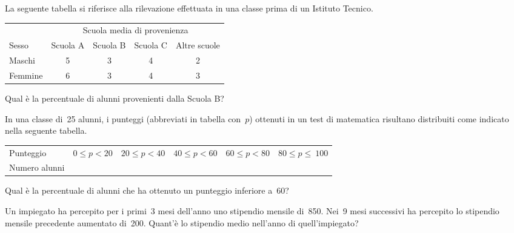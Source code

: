 \begin{esercizio}
\label{ese:A.52}
La seguente tabella si riferisce alla rilevazione effettuata in una classe prima di un Istituto Tecnico.
\begin{center}
 \begin{tabular}{l*{4}{c}}
\toprule
 & \multicolumn{4}{c}{Scuola media di provenienza}\\
Sesso & Scuola A & Scuola B & Scuola C & Altre scuole\\
\midrule
Maschi & 5 & 3 & 4 & 2 \\
Femmine & 6 & 3 & 4 & 3 \\
\bottomrule
\end{tabular}
\end{center}
Qual è la percentuale di alunni provenienti dalla Scuola B?
\end{esercizio}

\begin{esercizio}
\label{ese:A.53}
In una classe di~25 alunni, i punteggi (abbreviati in tabella con~$p$) ottenuti in un test di matematica risultano distribuiti come indicato nella seguente tabella.
\begin{center}
 \begin{tabular}{l*{5}{c}}
\toprule
Punteggio & $0 \leq p < 20$ & $20 \leq p < 40$ & $40 \leq p < 60$ & $60 \leq p < 80$ & $80 \leq p \leq~100$ \\
Numero alunni & & & & & \\
\bottomrule
\end{tabular}
\end{center}
Qual è la percentuale di alunni che ha ottenuto un punteggio inferiore a~60?
\end{esercizio}

\begin{esercizio}
\label{ese:A.54}
Un impiegato ha percepito per i primi~3 mesi dell'anno uno stipendio mensile di~850\officialeuro . Nei~9 mesi successivi ha percepito
lo stipendio mensile precedente aumentato di~200\officialeuro . Quant'è lo stipendio medio nell'anno di quell'impiegato?
\end{esercizio}

